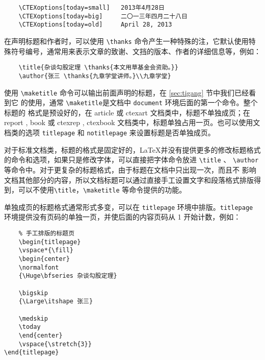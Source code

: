 \begin{lstlisting}
    \CTEXoptions[today=small]   2013年4月28日
    \CTEXoptions[today=big]     二〇一三年四月二十八日
    \CTEXoptions[today=old]     April 28, 2013
\end{lstlisting}

在声明标题和作者时，可以使用 \verb|\thanks| 命令产生一种特殊的注，它默认使用特殊符号编号，通常用来表示文章的致谢、文挡的版本、作者的详细信息等，例如：

\begin{lstlisting}
    \title{杂谈勾股定理 \thanks{本文用草基金会资助。}}
    \author{张三 \thanks{九章学堂讲师。}\\九章学堂}
\end{lstlisting}

使用 \verb|\maketitle| 命令可以输出前面声明的标题，在 \ref{sec:tigang} 节中我们已经看到它
的使用，通常 \verb|\maketitle|是文档中 \verb|document| 环境后面的第一个命令。整个标题的
格式是预设好的，在 article 或 ctexart 文档类中，标题不单独成页；在 report , book 或
ctexrep , ctexbook 文档类中，标题单独占用一页。也可以使用文档类的选项 \verb|titlepage|
和 \verb|notitlepage| 来设置标题是否单独成页。

对于标准文档类，标题的格式是固定好的，\LaTeX 并没有提供更多的修改标题格式的命令和选项，如果只是修改字体，可以直接把字体命令放进 \verb|\title| 、 \verb|\author| 等命令中。对于更复杂的标题格式，由于标题在文档中只出现一次，而且不
影响文档其他部分的内容，所以文档标题可以通过直接手工设置文字和段落格式排版得到，可以不使用\verb|\title|，\verb|\maketitle| 等命令提供的功能。

单独成页的标题格式通常形式多变，可以在 \verb|titlepage| 环境中排版。\verb|titlepage|
环境提供没有页码的单独一页，并使后面的内容页码从 1 开始计数，例如：

\begin{lstlisting}
    % 手工排版的标题页
    \begin{titlepage}
    \vspace*{\fill}
    \begin{center}
    \normalfont
    {\Huge\bfseries 杂谈勾股定理}

    \bigskip
    {\Large\itshape 张三}

    \medskip
    \today
    \end{center}
    \vspace{\stretch{3}}
\end{titlepage}
\end{lstlisting}

